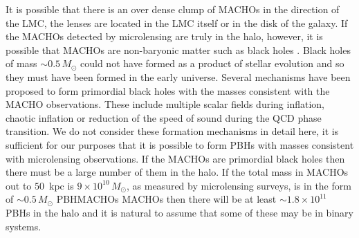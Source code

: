 It is possible that there is an over dense clump of MACHOs in the direction of
the LMC\cite{1996ApJ...473L..99N}, the lenses are located in the LMC
itself\cite{Salati:1999gd} or in the disk of the galaxy\cite{Evans:1997hq}. 
If the MACHOs detected by microlensing are truly in the halo, however, it is
possible that MACHOs are non-baryonic matter such as black holes
\cite{Finn:1996dd,Nakamura:1997sm}. Black holes of mass $\sim 0.5\,M_\odot$
could not have formed as a product of stellar evolution and so they must have
been formed in the early universe\cite{1967SvA....10..602Z,1974MNRAS.168..399C}.
Several mechanisms have been proposed to form primordial black holes with the
masses consistent with the MACHO observations. These include multiple scalar
fields during inflation\cite{Yokoyama:1995ex}, chaotic 
inflation\cite{Yokoyama:1999xi} or reduction of the speed of sound during the
QCD phase transition\cite{Jedamzik:1996mr}. We do not consider these formation
mechanisms in detail here, it is sufficient for our purposes that it is
possible to form PBHs with masses consistent with microlensing observations.
If the MACHOs are primordial black holes then there must be a large number of
them in the halo. If the total mass in MACHOs out to $50$~kpc is $9\times
10^{10}\,M_\odot$, as measured by microlensing surveys, is in the form of
$\sim 0.5\, M_\odot$ PBHMACHOs MACHOs then there will be at least $\sim 1.8
\times 10^{11}$ PBHs in the halo and it is natural to assume that some of
these may be in binary systems.

